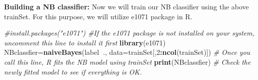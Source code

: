 \documentclass[]{article}
\newenvironment{Shaded}{\begin{snugshade}}{\end{snugshade}}
\newcommand{\CommentTok}[1]{\textcolor[rgb]{0.56,0.35,0.01}{\textit{#1}}}
\newcommand{\DataTypeTok}[1]{\textcolor[rgb]{0.13,0.29,0.53}{#1}}
\newcommand{\DecValTok}[1]{\textcolor[rgb]{0.00,0.00,0.81}{#1}}
\newcommand{\KeywordTok}[1]{\textcolor[rgb]{0.13,0.29,0.53}{\textbf{#1}}}
\newcommand{\NormalTok}[1]{#1}
\newcommand{\OperatorTok}[1]{\textcolor[rgb]{0.81,0.36,0.00}{\textbf{#1}}}
\begin{document}
\textbf{Building a NB classifier:} Now we will train our NB classiﬁer
using the above trainSet. For this purpose, we will utilize e1071
package in R.

\begin{Shaded}
\begin{Highlighting}[]
\CommentTok{#install.packages("e1071") #If the e1071 package is not installed on your system, uncomment this line to install it first}
\KeywordTok{library}\NormalTok{(e1071)}
\NormalTok{NBclassfier=}\KeywordTok{naiveBayes}\NormalTok{(label}\OperatorTok{~}\NormalTok{., }\DataTypeTok{data=}\NormalTok{trainSet[,}\DecValTok{2}\OperatorTok{:}\KeywordTok{ncol}\NormalTok{(trainSet)]) }\CommentTok{# Once you call this line, R fits the NB model using trainSet}
\KeywordTok{print}\NormalTok{(NBclassfier) }\CommentTok{# Check the newly fitted model to see if everything is OK.}
\end{Highlighting}
\end{Shaded}
\end{document}
